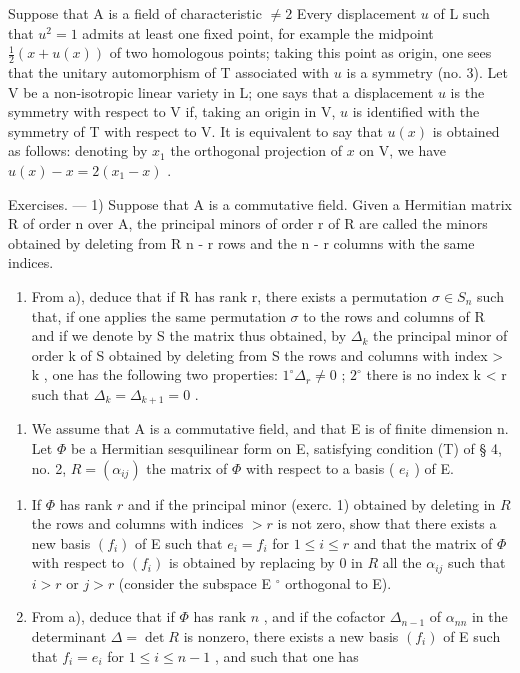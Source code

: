 Suppose that A is a field of characteristic \(\neq 2\) Every displacement \(u\) of L such that \(u^2 = 1\) admits at least one fixed point, for example the midpoint \(\frac{1}{2}(x + u(x))\) of two homologous points; taking this point as origin, one sees that the unitary automorphism of T associated with \(u\) is a symmetry (no. 3). Let V be a non-isotropic linear variety in L; one says that a displacement \(u\) is the symmetry with respect to V if, taking an origin in V, \(u\) is identified with the symmetry of T with respect to V. It is equivalent to say that \(u(x)\) is obtained as follows: denoting by \(x_1\) the orthogonal projection of \(x\) on V, we have \(u(x) - x = 2(x_1 - x)\) .

Exercises. --- 1) Suppose that A is a commutative field. Given a Hermitian matrix R of order n over A, the principal minors of order r of R are called the minors obtained by deleting from R n - r rows and the n - r columns with the same indices.

\begin{enumerate}
\def\labelenumi{\alph{enumi})}
\setcounter{enumi}{1}
\tightlist
\item
  From a), deduce that if R has rank r, there exists a permutation \(\sigma \in S_{n}\) such that, if one applies the same permutation \(\sigma\) to the rows and columns of R and if we denote by S the matrix thus obtained, by \(\Delta_{k}\) the principal minor of order k of S obtained by deleting from S the rows and columns with index \textgreater{} k , one has the following two properties: \(1^{\circ} \Delta_{r} \neq 0\) ; \(2^{\circ}\) there is no index k \textless{} r such that \(\Delta_{k} = \Delta_{k+1} = 0\) .
\end{enumerate}

\begin{enumerate}
\def\labelenumi{\arabic{enumi})}
\setcounter{enumi}{1}
\tightlist
\item
  We assume that A is a commutative field, and that E is of finite dimension n. Let \(\Phi\) be a Hermitian sesquilinear form on E, satisfying condition (T) of § 4, no. 2, \(R = (\alpha_{ij})\) the matrix of \(\Phi\) with respect to a basis ( \(e_i\) ) of E.
\end{enumerate}

\begin{enumerate}
\def\labelenumi{\alph{enumi})}
\item
  If \(\Phi\) has rank \(r\) and if the principal minor (exerc. 1) obtained by deleting in \(R\) the rows and columns with indices \(>r\) is not zero, show that there exists a new basis \((f_i)\) of E such that \(e_i = f_i\) for \(1 \leqslant i \leqslant r\) and that the matrix of \(\Phi\) with respect to \((f_i)\) is obtained by replacing by 0 in \(R\) all the \(\alpha_{ij}\) such that \(i > r\) or \(j > r\) (consider the subspace E \(^\circ\) orthogonal to E).
\item
  From a), deduce that if \(\Phi\) has rank \(n\) , and if the cofactor \(\Delta_{n-1}\) of \(\alpha_{nn}\) in the determinant \(\Delta = \det R\) is nonzero, there exists a new basis \((f_i)\) of E such that \(f_i = e_i\) for \(1 \leqslant i \leqslant n-1\) , and such that one has
\end{enumerate}

